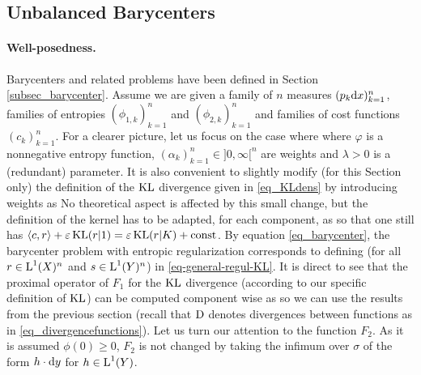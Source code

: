 
\subsection{Unbalanced Barycenters}
\label{sec_appli_bary}

\paragraph{Well-posedness.}
Barycenters and related problems have been defined in Section \ref{subsec_barycenter}. Assume we are given a family of $n$ measures $(p_k \mathrm{d} x )_{k=1}^n$, families of entropies $(\phi_{1,k})_{k=1}^n$ and $(\phi_{2,k})_{k=1}^n$ and families of cost functions $(c_k)_{k=1}^n$. For a clearer picture, let us focus on the case where 
where $\varphi$ is a nonnegative entropy function, $(\alpha_k)_{k=1}^n \in ]0,\infty[^n$ are weights and $\lambda>0$ is a (redundant) parameter. It is also convenient to slightly modify (for this Section only) the definition of the $\operatorname{KL}$ divergence given in \eqref{eq_KLdens} by introducing weights as
No theoretical aspect is affected by this small change, but the definition of the kernel has to be adapted, for each component, as
so that one still has $\langle c, r \rangle + \varepsilon \operatorname{KL}(r|1) = \varepsilon \operatorname{KL}(r|K)+\textnormal{const}$.
%
By equation \eqref{eq_barycenter}, the barycenter problem with entropic regularization corresponds to defining   
(for all $r\in \text{\upshape L}^1(X)^n$ and $s\in \text{\upshape L}^1(Y)^n$) in \eqref{eq-general-regul-KL}. It is direct to see that the proximal operator of $F_1$ for the $\operatorname{KL}$ divergence (according to our specific definition of $\operatorname{KL}$) can be computed component wise as 
so we can use the results from the previous section (recall that $\operatorname{D}$ denotes divergences between functions as in \eqref{eq_divergencefunctions}). Let us turn our attention to the function $F_2$. As it is assumed $\phi(0)\geq0$, $F_2$ is not changed by taking the infimum over $\sigma$ of the form $h \cdot \mathrm{d} y$ for $h\in \text{\upshape L}^1(Y)$.

